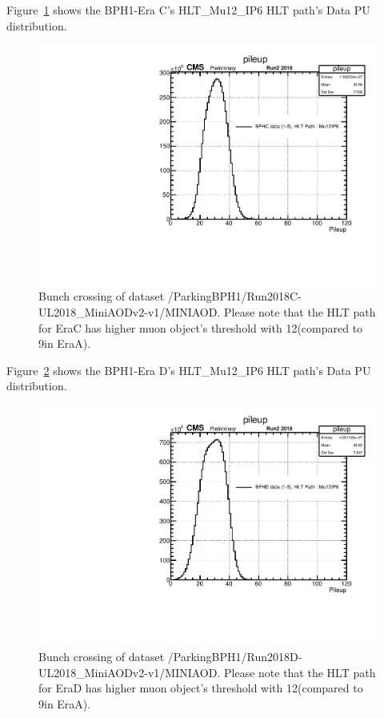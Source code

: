Figure~\ref{fig:EraCData} shows the BPH1-Era C's HLT\_Mu12\_IP6 HLT path's Data PU distribution.
\begin{figure}[h!]
  \label{fig:EraCData}
  \centering
  \includegraphics[width=0.57\linewidth]{figs/NVtx_BPHC.pdf}
\caption{Bunch crossing of dataset /ParkingBPH1/Run2018C-UL2018\_MiniAODv2-v1/MINIAOD. Please note that the HLT path for EraC has higher muon object's \pt threshold with 12\GeV (compared to 9\GeV in EraA).}

\end{figure}

Figure~\ref{fig:EraDData} shows the BPH1-Era D's HLT\_Mu12\_IP6 HLT path's Data PU distribution.
\begin{figure}[h!]
  \label{fig:EraDData}
  \centering
  \includegraphics[width=0.57\linewidth]{figs/NVtx_BPHD.pdf}
\caption{Bunch crossing of dataset /ParkingBPH1/Run2018D-UL2018\_MiniAODv2-v1/MINIAOD. Please note that the HLT path for EraD has higher muon object's \pt threshold with 12\GeV (compared to 9\GeV in EraA).}

\end{figure}

